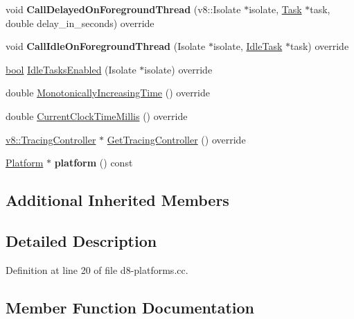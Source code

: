 \begin{DoxyCompactItemize}
\item 
\mbox{\label{classv8_1_1PredictablePlatform_a9a3335538bf07364a107d77f2a654261}} 
void {\bfseries Call\+Delayed\+On\+Foreground\+Thread} (v8\+::\+Isolate $\ast$isolate, \mbox{\hyperlink{classv8_1_1Task}{Task}} $\ast$task, double delay\+\_\+in\+\_\+seconds) override
\item 
\mbox{\label{classv8_1_1PredictablePlatform_a62db653be45e05cbbf292f58812e5771}} 
void {\bfseries Call\+Idle\+On\+Foreground\+Thread} (Isolate $\ast$isolate, \mbox{\hyperlink{classv8_1_1IdleTask}{Idle\+Task}} $\ast$task) override
\item 
\mbox{\hyperlink{classbool}{bool}} \mbox{\hyperlink{classv8_1_1PredictablePlatform_ad79dbc4e7ebdbbe1c3cc90872161f845}{Idle\+Tasks\+Enabled}} (Isolate $\ast$isolate) override
\item 
double \mbox{\hyperlink{classv8_1_1PredictablePlatform_a5ea9a10dff864d311e3612ec340a6710}{Monotonically\+Increasing\+Time}} () override
\item 
double \mbox{\hyperlink{classv8_1_1PredictablePlatform_a910c1b4977cca092adec3d11b3f3b242}{Current\+Clock\+Time\+Millis}} () override
\item 
\mbox{\hyperlink{classv8_1_1TracingController}{v8\+::\+Tracing\+Controller}} $\ast$ \mbox{\hyperlink{classv8_1_1PredictablePlatform_acea822c93bd1f6a51439d21a59aa5d48}{Get\+Tracing\+Controller}} () override
\item 
\mbox{\label{classv8_1_1PredictablePlatform_a1a30a1c9949f3c45f0447328f5b352aa}} 
\mbox{\hyperlink{classv8_1_1Platform}{Platform}} $\ast$ {\bfseries platform} () const
\end{DoxyCompactItemize}
\subsection*{Additional Inherited Members}


\subsection{Detailed Description}


Definition at line 20 of file d8-\/platforms.\+cc.



\subsection{Member Function Documentation}
\mbox{\label{classv8_1_1PredictablePlatform_aebe343ebe283f3ffdc905282fbfeb5ad}} 
